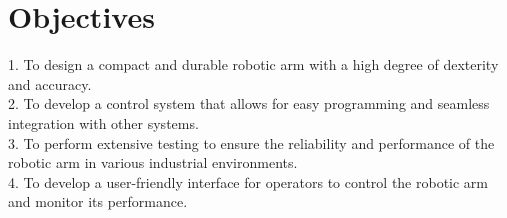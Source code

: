 \section{Objectives}
1. To design a compact and durable robotic arm with a high degree of dexterity and accuracy.\\
2. To develop a control system that allows for easy programming and seamless integration with other systems.\\
3. To perform extensive testing to ensure the reliability and performance of the robotic arm in various industrial environments.\\
4. To develop a user-friendly interface for operators to control the robotic arm and monitor its performance.
